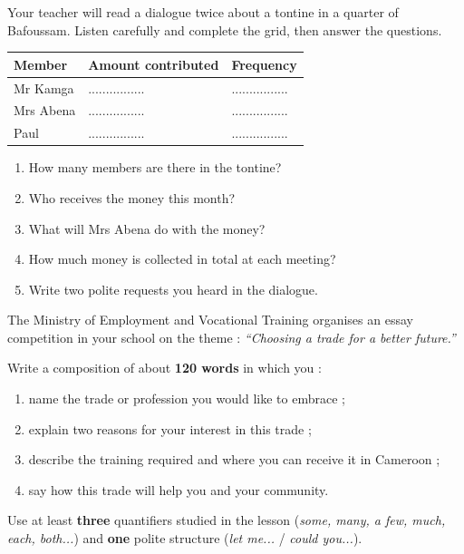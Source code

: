 \documentclass[11pt]{article}
\begin{document}
\begin{exercice}
Your teacher will read a dialogue twice about a tontine in a quarter of Bafoussam. Listen carefully and complete the grid, then answer the questions.

\begin{center}
\begin{tabularx}{\linewidth}{|l|X|X|}
\hline
\rowcolor{popblueL} \textbf{Member} & \textbf{Amount contributed} & \textbf{Frequency} \\
\hline
Mr Kamga & ................ & ................ \\
\hline
Mrs Abena & ................ & ................ \\
\hline
Paul & ................ & ................ \\
\hline
\end{tabularx}
\end{center}

\begin{enumerate}
\item How many members are there in the tontine?
\item Who receives the money this month?
\item What will Mrs Abena do with the money?
\item How much money is collected in total at each meeting?
\item Write two polite requests you heard in the dialogue.
\end{enumerate}
\end{exercice}

\begin{exercice}
The Ministry of Employment and Vocational Training organises an essay competition in your school on the theme : \emph{``Choosing a trade for a better future.''}

Write a composition of about \textbf{120 words} in which you :
\begin{enumerate}
\item name the trade or profession you would like to embrace ;
\item explain two reasons for your interest in this trade ;
\item describe the training required and where you can receive it in Cameroon ;
\item say how this trade will help you and your community.
\end{enumerate}

Use at least \textbf{three} quantifiers studied in the lesson (\emph{some, many, a few, much, each, both...}) and \textbf{one} polite structure (\emph{let me...} / \emph{could you...}).
\end{exercice}
\end{document}
